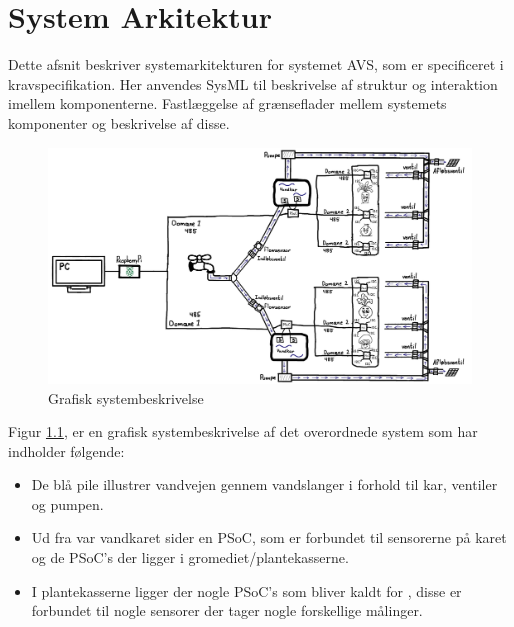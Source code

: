 
\chapter{System Arkitektur}


Dette afsnit beskriver systemarkitekturen for systemet \gls{AVS}, som er specificeret i kravspecifikation. Her anvendes SysML til beskrivelse af struktur og interaktion imellem komponenterne. Fastlæggelse af grænseflader mellem systemets komponenter og beskrivelse af disse.

\begin{figure}[H]
    \centering
    \includegraphics[width=\textwidth]{SystemArkitektur/AVS}
    \caption{Grafisk systembeskrivelse}
    \label{fig:graf_sys}
\end{figure}
Figur \ref{fig:graf_sys}, er en grafisk systembeskrivelse af det overordnede system som har indholder følgende:
\begin{itemize}
\item De blå pile illustrer vandvejen gennem vandslanger i forhold til kar, ventiler og pumpen. 
\item Ud fra var vandkaret sider en PSoC, som er forbundet til sensorerne på karet og de PSoC's der ligger i gromediet/plantekasserne.
\item I plantekasserne ligger der nogle PSoC's som bliver kaldt for , disse er forbundet til nogle sensorer der tager nogle forskellige målinger. 
\end{itemize}
